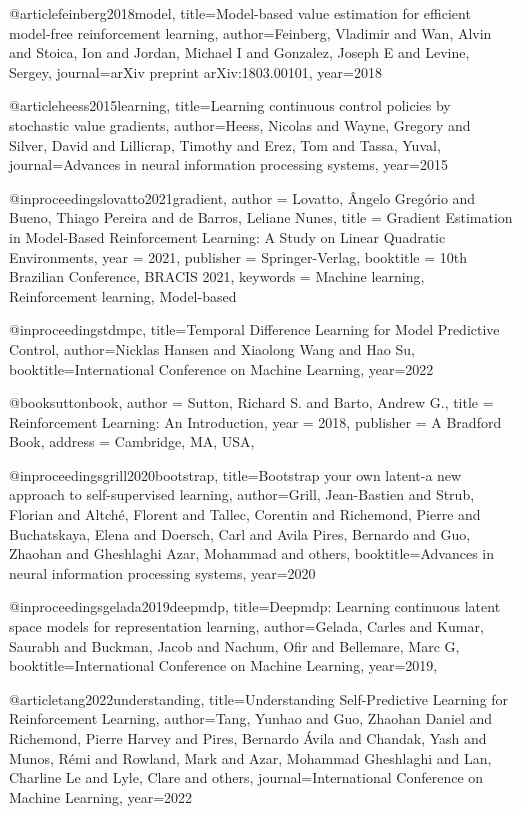 @article{feinberg2018model,
  title={Model-based value estimation for efficient model-free reinforcement learning},
  author={Feinberg, Vladimir and Wan, Alvin and Stoica, Ion and Jordan, Michael I and Gonzalez, Joseph E and Levine, Sergey},
  journal={arXiv preprint arXiv:1803.00101},
  year={2018}
}

@article{heess2015learning,
  title={Learning continuous control policies by stochastic value gradients},
  author={Heess, Nicolas and Wayne, Gregory and Silver, David and Lillicrap, Timothy and Erez, Tom and Tassa, Yuval},
  journal={Advances in neural information processing systems},
  year={2015}
}

@inproceedings{lovatto2021gradient,
author = {Lovatto, \^{A}ngelo Greg\'{o}rio and Bueno, Thiago Pereira and de Barros, Leliane Nunes},
title = {Gradient Estimation in Model-Based Reinforcement Learning: A Study on Linear Quadratic Environments},
year = {2021},
publisher = {Springer-Verlag},
booktitle = {10th Brazilian Conference, BRACIS 2021},
keywords = {Machine learning, Reinforcement learning, Model-based}
}

@inproceedings{tdmpc,
	title={Temporal Difference Learning for Model Predictive Control},
	author={Nicklas Hansen and Xiaolong Wang and Hao Su},
	booktitle={International Conference on Machine Learning},
	year={2022}
}

@book{suttonbook,
author = {Sutton, Richard S. and Barto, Andrew G.},
title = {Reinforcement Learning: An Introduction},
year = {2018},
publisher = {A Bradford Book},
address = {Cambridge, MA, USA},
}

@inproceedings{grill2020bootstrap,
  title={Bootstrap your own latent-a new approach to self-supervised learning},
  author={Grill, Jean-Bastien and Strub, Florian and Altch{\'e}, Florent and Tallec, Corentin and Richemond, Pierre and Buchatskaya, Elena and Doersch, Carl and Avila Pires, Bernardo and Guo, Zhaohan and Gheshlaghi Azar, Mohammad and others},
  booktitle={Advances in neural information processing systems},
  year={2020}
}

@inproceedings{gelada2019deepmdp,
  title={Deepmdp: Learning continuous latent space models for representation learning},
  author={Gelada, Carles and Kumar, Saurabh and Buckman, Jacob and Nachum, Ofir and Bellemare, Marc G},
  booktitle={International Conference on Machine Learning},
  year={2019},
}

@article{tang2022understanding,
  title={Understanding Self-Predictive Learning for Reinforcement Learning},
  author={Tang, Yunhao and Guo, Zhaohan Daniel and Richemond, Pierre Harvey and Pires, Bernardo {\'A}vila and Chandak, Yash and Munos, R{\'e}mi and Rowland, Mark and Azar, Mohammad Gheshlaghi and Lan, Charline Le and Lyle, Clare and others},
  journal={International Conference on Machine Learning},
  year={2022}
}

